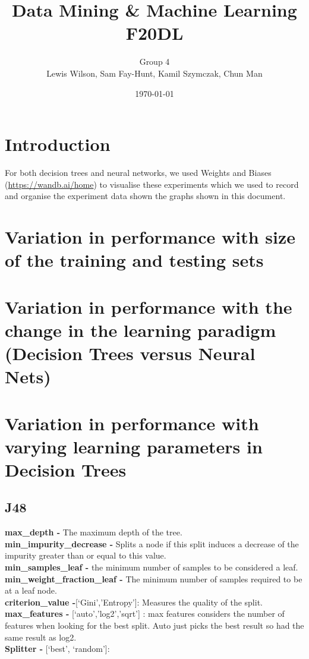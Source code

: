 \documentclass[11pt]{article}
\begin{document}
\title{\huge Data Mining \& Machine Learning F20DL} 
\author{Group 4\\Lewis Wilson, Sam Fay-Hunt, Kamil Szymczak, Chun Man }
\date{\today}
\maketitle

\newpage
\tableofcontents
\thispagestyle{empty}
\pagebreak
\setcounter{page}{1}
\newpage
\section{Introduction}
For both decision trees and neural networks, we used Weights and Biases (\url{https://wandb.ai/home}) to visualise these experiments which we used to record and organise the experiment data shown the graphs shown in this document.


\newpage
\section{Variation in performance with size of the training and testing sets}

\newpage
\section{Variation in performance with the change in the learning paradigm (Decision Trees versus
Neural Nets)}

\newpage
\section{Variation in performance with varying learning parameters in Decision Trees}
\subsection{J48}

\textbf{max\_depth -} The maximum depth of the tree. \\
\textbf{min\_impurity\_decrease -} Splits a node if this split induces a decrease of the impurity greater than or equal to this value. \\
\textbf{min\_samples\_leaf -} the minimum number of samples to be considered a leaf. \\
\textbf{min\_weight\_fraction\_leaf -} The minimum number of samples required to be at a leaf node. \\
\textbf{criterion\_value -}[‘Gini’,’Entropy’]: Measures the quality of the split.
\textbf{max\_features -} [‘auto’,’log2’,’sqrt’] : max features considers the number of features when looking for the best split. Auto just picks the best result so had the same result as log2. \\
\textbf{Splitter -} [‘best’, ‘random’]: \\
\end{document}
